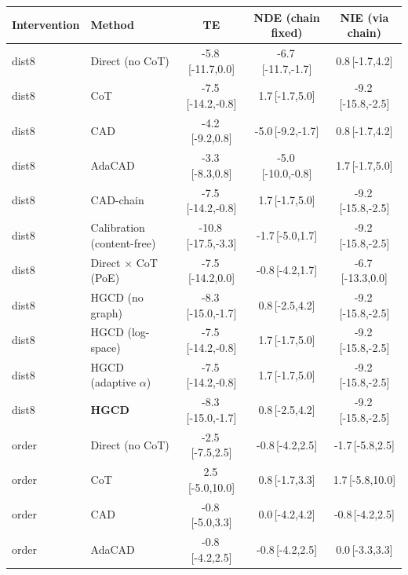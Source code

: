 \begin{tabular}{llccc}
\toprule
Intervention & Method & TE & NDE (chain fixed) & NIE (via chain) \\
\midrule
dist8 & Direct (no CoT) & -5.8\,{\scriptsize[-11.7,0.0]} & -6.7\,{\scriptsize[-11.7,-1.7]} & 0.8\,{\scriptsize[-1.7,4.2]} \\
dist8 & CoT & -7.5\,{\scriptsize[-14.2,-0.8]} & 1.7\,{\scriptsize[-1.7,5.0]} & -9.2\,{\scriptsize[-15.8,-2.5]} \\
dist8 & CAD & -4.2\,{\scriptsize[-9.2,0.8]} & -5.0\,{\scriptsize[-9.2,-1.7]} & 0.8\,{\scriptsize[-1.7,4.2]} \\
dist8 & AdaCAD & -3.3\,{\scriptsize[-8.3,0.8]} & -5.0\,{\scriptsize[-10.0,-0.8]} & 1.7\,{\scriptsize[-1.7,5.0]} \\
dist8 & CAD-chain & -7.5\,{\scriptsize[-14.2,-0.8]} & 1.7\,{\scriptsize[-1.7,5.0]} & -9.2\,{\scriptsize[-15.8,-2.5]} \\
dist8 & Calibration (content-free) & -10.8\,{\scriptsize[-17.5,-3.3]} & -1.7\,{\scriptsize[-5.0,1.7]} & -9.2\,{\scriptsize[-15.8,-2.5]} \\
dist8 & Direct $\times$ CoT (PoE) & -7.5\,{\scriptsize[-14.2,0.0]} & -0.8\,{\scriptsize[-4.2,1.7]} & -6.7\,{\scriptsize[-13.3,0.0]} \\
dist8 & HGCD (no graph) & -8.3\,{\scriptsize[-15.0,-1.7]} & 0.8\,{\scriptsize[-2.5,4.2]} & -9.2\,{\scriptsize[-15.8,-2.5]} \\
dist8 & HGCD (log-space) & -7.5\,{\scriptsize[-14.2,-0.8]} & 1.7\,{\scriptsize[-1.7,5.0]} & -9.2\,{\scriptsize[-15.8,-2.5]} \\
dist8 & HGCD (adaptive $\alpha$) & -7.5\,{\scriptsize[-14.2,-0.8]} & 1.7\,{\scriptsize[-1.7,5.0]} & -9.2\,{\scriptsize[-15.8,-2.5]} \\
dist8 & \textbf{HGCD} & -8.3\,{\scriptsize[-15.0,-1.7]} & 0.8\,{\scriptsize[-2.5,4.2]} & -9.2\,{\scriptsize[-15.8,-2.5]} \\
\midrule
order & Direct (no CoT) & -2.5\,{\scriptsize[-7.5,2.5]} & -0.8\,{\scriptsize[-4.2,2.5]} & -1.7\,{\scriptsize[-5.8,2.5]} \\
order & CoT & 2.5\,{\scriptsize[-5.0,10.0]} & 0.8\,{\scriptsize[-1.7,3.3]} & 1.7\,{\scriptsize[-5.8,10.0]} \\
order & CAD & -0.8\,{\scriptsize[-5.0,3.3]} & 0.0\,{\scriptsize[-4.2,4.2]} & -0.8\,{\scriptsize[-4.2,2.5]} \\
order & AdaCAD & -0.8\,{\scriptsize[-4.2,2.5]} & -0.8\,{\scriptsize[-4.2,2.5]} & 0.0\,{\scriptsize[-3.3,3.3]} \\

\end{tabular}
